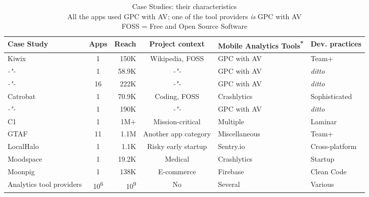 \begin{table}
    \centering
    \tabcolsep=0.06cm
    \footnotesize
    \begin{tabular}{lcrcll}\toprule
    Case Study               & Apps                 & Reach & Project context & Mobile Analytics Tools\textsuperscript{*}  &Dev. practices  \\
    \midrule
    Kiwix                    &                    1 &  150K & Wikipedia, FOSS            & GPC with AV &          Team+ \\ 
     \textit{-"-}            &                    1 & 58.9K & \textit{-"-}   & GPC with AV & \textit{ditto} \\
     \textit{-"-}            &                   16 &  222K & \textit{-"-}   & GPC with AV & \textit{ditto} \\
    Catrobat                 &                    1 & 70.9K & Coding, FOSS            & Crashlytics &  Sophisticated \\
     \textit{-"-}            &                    1 &  190K & \textit{-"-}   & GPC with AV & \textit{ditto} \\
    C1                       &                    1 &  1M+  & Mission-critical &    Multiple &        Laminar \\
    GTAF                     &                   11 &  1.1M & Another app category             &Miscellaneous &          Team+ \\
    LocalHalo                &                    1 &  1.1K & Risky early startup &   Sentry.io & Cross-platform \\
    Moodspace                &                    1 & 19.2K & Medical    & Crashlytics &        Startup \\
    Moonpig                  &                    1 & 138K  & E-commerce &    Firebase &     Clean Code \\
    Analytics tool providers &10\textsuperscript{6} &10\textsuperscript{9} & No &  Several &        Various \\
    \bottomrule
    \end{tabular}
    \caption[Case Studies: their characteristics]{Case Studies: their characteristics \\ {\tiny * All the apps used GPC with AV; one of the tool providers \emph{is} GPC with AV \\ FOSS = Free and Open Source Software}}
    \label{tab:empirical-studies-their-characteristics}
\end{table}


